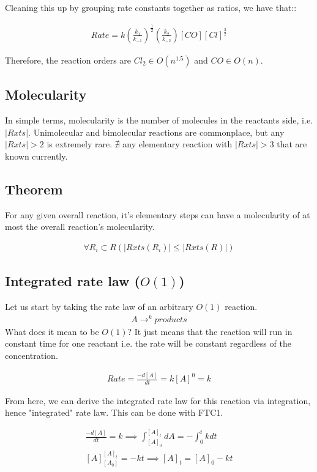 \documentclass[12pt]{book}
\begin{document}
Cleaning this up by grouping rate constants together as ratios, we have that::

\begin{align*}
    Rate=k\left(\frac{k_1}{k_{-1}}\right)^{\frac{1}{2}}\left(\frac{k_2}{k_{-2}}\right)[CO][Cl]^{\frac{3}{2}}
\end{align*}

Therefore, the reaction orders are $Cl_2\in O(n^{1.5})$ and $CO\in O(n)$.

\subsection*{Molecularity}

In simple terms, molecularity is the number of molecules in the reactants side, i.e. $|Rxts|$. Unimolecular and bimolecular reactions are commonplace, but any $|Rxts|>2$ is extremely rare. $\nexists$ any elementary reaction with $|Rxts|>3$ that are known currently. 

\subsection*{Theorem}
For any given overall reaction, it's elementary steps can have a molecularity of at most the overall reaction's molecularity.

\begin{align*}
    \forall R_i\subset R(|Rxts(R_i)|\leq|Rxts(R)|)
\end{align*}

\subsection*{Integrated rate law ($O(1)$)}
Let us start by taking the rate law of an arbitrary $O(1)$ reaction. 
\begin{align}
    A\rightarrow^k products
\end{align}
What does it mean to be $O(1)$? It just means that the reaction will run in constant time for one reactant i.e. the rate will be constant regardless of the concentration.

\begin{align}
    Rate=\frac{-d[A]}{dt}=k[A]^0=k
\end{align}

From here, we can derive the integrated rate law for this reaction via integration, hence "integrated" rate law. This can be done with FTC1.

\begin{align}
    \frac{-d[A]}{dt}=k\implies \int_{[A]_0}^{[A]_t}dA=-\int_{0}^{t}kdt\\
    [A]_{[A_0]}^{[A]_t}=-kt\implies [A]_t=[A]_0-kt
\end{align}
\end{document}
